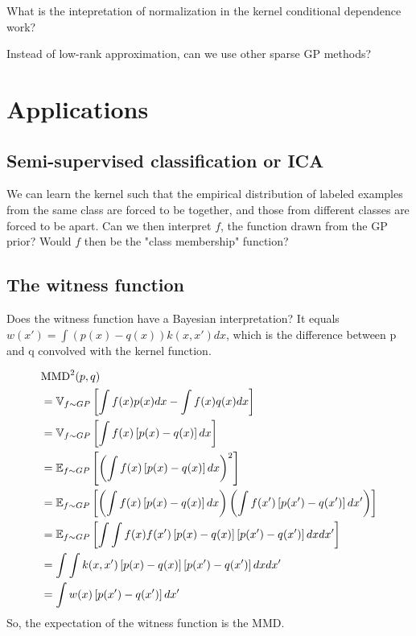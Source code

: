 \documentclass{article} %
\begin{document}
What is the intepretation of normalization in the kernel conditional dependence work?

Instead of low-rank approximation, can we use other sparse GP methods?

\section{Applications}

\subsection{Semi-supervised classification or ICA}

We can learn the kernel such that the empirical distribution of labeled examples from the same class are forced to be together, and those from different classes are forced to be apart.  Can we then interpret $f$, the function drawn from the GP prior?  Would $f$ then be the "class membership" function?

\subsection{The witness function}

Does the witness function have a Bayesian interpretation?  It equals $w(x') = \int (p(x)-q(x)) k(x, x') dx$, which is the difference between p and q convolved with the kernel function.


\begin{align}
 & {\rm MMD}^2(p,q) \\
	&= \mathbb{V}_{f\sim GP} \left[ { \int f(x) p(x) dx -  \int f(x) q(x) dx } \right]\\
	&= \mathbb{V}_{f\sim GP} \left[ { \int f(x) \left[ p(x) -q(x) \right] dx} \right]\\
	&= \mathbb{E}_{f\sim GP} \left[ { \left(\int f(x) \left[ p(x) -q(x) \right] dx \right)^2} \right]\\	
	&= \mathbb{E}_{f\sim GP} \left[ { \left(\int f(x) \left[ p(x) -q(x) \right] dx \right)\left(\int f(x') \left[ p(x') -q(x') \right] dx' \right)} \right]\\	
	&= \mathbb{E}_{f\sim GP} \left[ { \int \int f(x) f(x') \left[ p(x) -q(x) \right] \left[ p(x') -q(x') \right] dx dx' } \right]\\	
	&=  \int \int k(x,x') \left[ p(x) -q(x) \right] \left[ p(x') -q(x') \right] dx dx'\\
	&=  \int w(x) \left[ p(x') -q(x') \right] dx'
\end{align}
%
So, the expectation of the witness function is the MMD.
\end{document}
